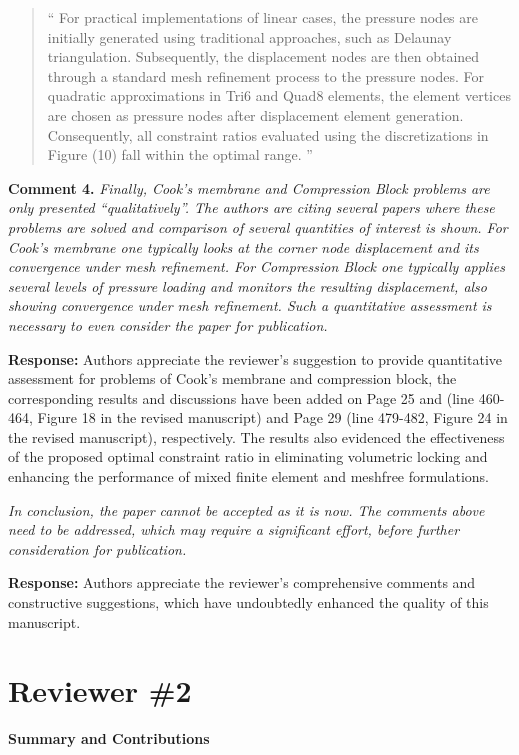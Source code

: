 \documentclass{article}
\begin{document}
\begin{quote}``
For practical implementations of linear cases, the pressure nodes are initially generated using traditional approaches, such as Delaunay triangulation.
Subsequently, the displacement nodes are then obtained through a standard mesh refinement process to the pressure nodes.
For quadratic approximations in Tri6 and Quad8 elements, the element vertices are chosen as pressure nodes after displacement element generation.
Consequently, all constraint ratios evaluated using the discretizations in Figure (10) fall within the optimal range.
''\end{quote}

\textbf{Comment 4.} \textit{Finally, Cook's membrane and Compression Block problems are only presented ``qualitatively''. The authors are citing several papers where these problems are solved and comparison of several quantities of interest is shown. For Cook's membrane one typically looks at the corner node displacement and its convergence under mesh refinement. For Compression Block one typically applies several levels of pressure loading and monitors the resulting displacement, also showing convergence under mesh refinement. Such a quantitative assessment is necessary to even consider the paper for publication.}

\textbf{Response:} Authors appreciate the reviewer's suggestion to provide quantitative assessment for problems of Cook's membrane and compression block, the corresponding results and discussions have been added on Page 25 and (line 460-464, Figure 18 in the revised manuscript) and Page 29 (line 479-482, Figure 24 in the revised manuscript), respectively.
The results also evidenced the effectiveness of the proposed optimal constraint ratio in eliminating volumetric locking and enhancing the performance of mixed finite element and meshfree formulations.

\textit{In conclusion, the paper cannot be accepted as it is now. The comments above need to be addressed, which may require a significant effort, before further consideration for publication.}

\textbf{Response:} 
Authors appreciate the reviewer's comprehensive comments and constructive suggestions, which have undoubtedly enhanced the quality of this manuscript.


\section*{Reviewer \#2}
\textbf{Summary and Contributions}
\end{document}
